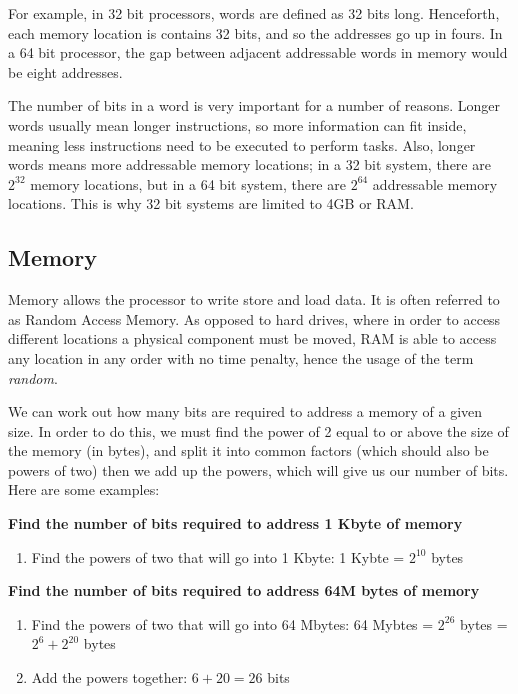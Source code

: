 
For example, in 32 bit processors, words are defined as 32 bits long.
Henceforth, each memory location is contains 32 bits, and so the addresses go up
in fours. In a 64 bit processor, the gap between adjacent addressable words in
memory would be eight addresses.

The number of bits in a word is very important for a number of reasons. Longer
words usually mean longer instructions, so more information can fit inside,
meaning less instructions need to be executed to perform tasks. Also, longer
words means more addressable memory locations; in a 32 bit system, there are
$2^{32}$ memory locations, but in a 64 bit system, there are $2^{64}$
addressable memory locations. This is why 32 bit systems are limited to 4GB or
RAM.

\subsection{Memory}

Memory allows the processor to write store and load data. It is often referred
to as Random Access Memory. As opposed to hard drives, where in order to access
different locations a physical component must be moved, RAM is able to access
any location in any order with no time penalty, hence the usage of the term {\it
random}.

We can work out how many bits are required to address a memory of a given size.
In order to do this, we must find the power of 2 equal to or above the size of
the memory (in bytes), and split it into common factors (which should also be
powers of two) then we add up the powers, which will give us our number of bits.
Here are some examples:

{\bf Find the number of bits required to address 1 Kbyte of memory}

\begin{enumerate}
	\item Find the powers of two that will go into 1 Kbyte:
			1 Kybte = $2^{10}$ bytes
\end{enumerate}

{\bf Find the number of bits required to address 64M bytes of memory}

\begin{enumerate}
	\item Find the powers of two that will go into 64 Mbytes:
			64 Mybtes = $2^{26}$ bytes = $2^6 + 2^{20}$ bytes
	\item Add the powers together:
			$6 + 20 = 26$ bits
\end{enumerate}


